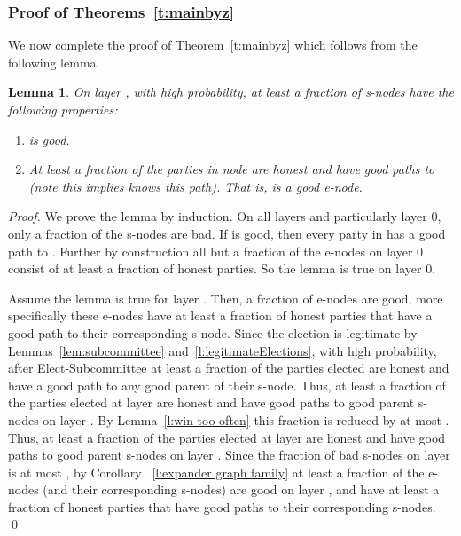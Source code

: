 \documentclass[11pt,letter]{article}
\theoremstyle{mytheoremstyle}
\newtheorem{lemma}{Lemma}
\newcommand{\es}{\mbox{\textsf{Elect-Subcommittee}}\xspace}
\begin{document}
\begin{description}
{\subsubsection{Proof of Theorems~\ref{t:mainbyz}}

We now complete the proof of Theorem~\ref{t:mainbyz} which follows from the following lemma.

\begin{lemma}
	\label{l:main}
	On layer , with high probability, at least a  fraction of \textsf{s-node}s  have the following properties:
	\begin{enumerate}
		\item  is good.

		\item At least a  fraction of the parties in node  are honest and have good paths to  (note this implies  knows this path). That is,  is a good \textsf{e-node}.
	\end{enumerate}
\end{lemma}
\begin{proof}
	We prove the lemma by induction. On all layers and particularly layer 0, only a  fraction of the \textsf{s-node}s are bad. If  is good, then every party in  has a good path to . Further by construction all but a  fraction of the \textsf{e-node}s on layer 0 consist of at least a  fraction of honest parties. So the lemma is true on layer 0.
	
	Assume the lemma is true for layer . Then, a  fraction of \textsf{e-node}s are good, more specifically these \textsf{e-node}s have at least a  fraction of honest parties that have a good path to their corresponding \textsf{s-node}. Since the election is legitimate by Lemmas~\ref{lem:subcommittee}
	and~\ref{l:legitimateElections}, with high probability, after \es at least a  fraction of the parties elected are honest and have a good path to any good parent of their \textsf{s-node}. Thus, at least a  fraction of the parties elected at layer  are honest and have good paths to good parent \textsf{s-node}s on layer . By Lemma~\ref{l:win too often} this fraction is reduced by at most . Thus, at least a  fraction of the parties elected at layer  are honest and have good paths to good parent \textsf{s-node}s on layer . Since the fraction of bad \textsf{s-node}s on layer  is at most , by Corollary ~\ref{l:expander graph family} at least a  fraction of the
	\textsf{e-node}s (and their corresponding \textsf{s-node}s) are good on layer , and have at least a  fraction of honest parties that have good paths to their corresponding \textsf{s-node}s.
	\qed
\end{proof}

}
\end{description}
\end{document}
